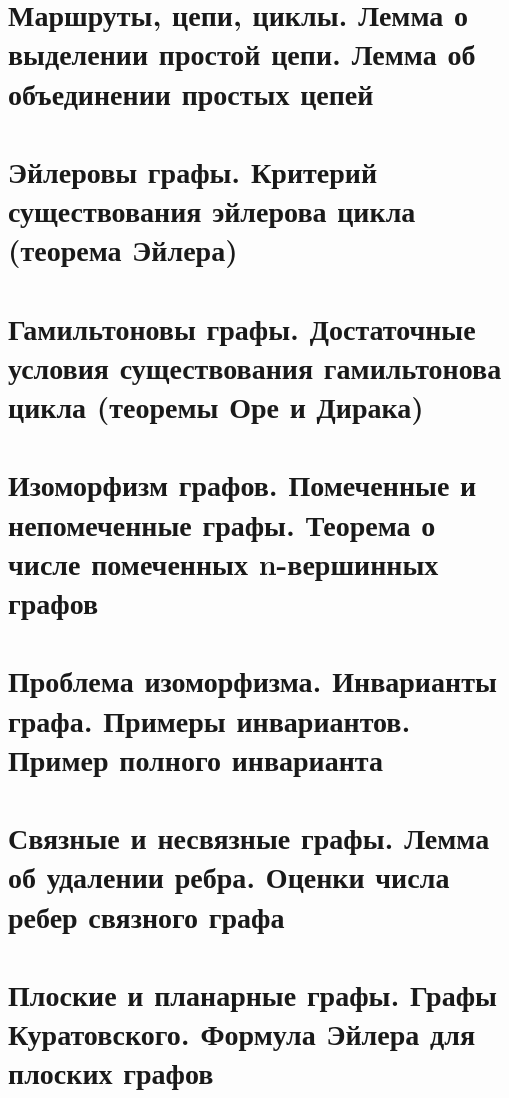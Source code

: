 \documentclass[a4paper]{article}
\theoremstyle{definition}
\theoremstyle{remark}
\begin{document}
\begin{multicols*}{2}
    \section{Маршруты, цепи, циклы. Лемма о выделении простой цепи. Лемма об объединении 
    простых цепей}
    \section{Эйлеровы графы. Критерий существования эйлерова цикла (теорема Эйлера)}
    \section{Гамильтоновы графы. Достаточные условия существования гамильтонова цикла (теоремы 
    Оре и Дирака)}
    \section{Изоморфизм графов. Помеченные и непомеченные графы. Теорема о числе помеченных 
    n-вершинных графов}
    \section{Проблема изоморфизма. Инварианты графа. Примеры инвариантов. Пример полного 
    инварианта}
    \section{Связные и несвязные графы. Лемма об удалении ребра. Оценки числа ребер связного 
    графа}
    \section{Плоские и планарные графы. Графы Куратовского. Формула Эйлера для плоских графов}

\end{multicols*}
\end{document}
